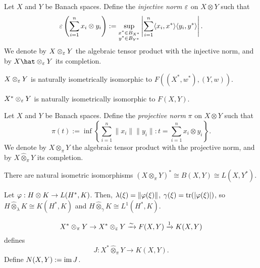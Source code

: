 \documentclass{../../small}
\begin{document}
\begin{prb}

\end{prb}

\begin{prb}
Let $X$ and $Y$ be Banach spaces.
Define the \emph{injective norm} $\varepsilon$ on $X\otimes Y$ such that
\[\varepsilon\left(\sum_{i=1}^nx_i\otimes y_i\right):=\sup_{\substack{x^*\in B_{X^*}\\y^*\in B_{Y^*}}}\left|\sum_{i=1}^n\langle x_i,x^*\rangle\langle y_i,y^*\rangle\right|.\]
We denote by $X\otimes_\varepsilon Y$ the algebraic tensor product with the injective norm, and by $X\hat\otimes_\e Y$ its completion.
\begin{parts}
\item $X\otimes_\varepsilon Y$ is naturally isometrically isomorphic to $F((X^*,w^*),(Y,w))$.
\item $X^*\otimes_\varepsilon Y$ is naturally isometrically isomorphic to $F(X,Y)$.
\end{parts}
\end{prb}

\begin{prb}
Let $X$ and $Y$ be Banach spaces.
Define the \emph{projective norm} $\pi$ on $X\otimes Y$ such that
\[\pi\left(t\right):=\inf\left\{\sum_{i=1}^n\|x_i\|\|y_i\|:t=\sum_{i=1}^nx_i\otimes y_i\right\}.\]
We denote by $X\otimes_\pi Y$ the algebraic tensor product with the projective norm, and by $X\hat\otimes_\pi Y$ its completion.
\begin{parts}
\item There are natural isometric isomorphisms $(X\otimes_\pi Y)^*\cong B(X,Y)\cong L(X,Y^*)$.
\item
\end{parts}
\end{prb}

\begin{prb}

Let $\varphi:H\otimes K\to L(H^*,K)$.
Then, $\lambda(\xi)=\|\varphi(\xi)\|$, $\gamma(\xi)=\operatorname{tr}(|\varphi(\xi)|)$, so $H\hat\otimes_\lambda K\cong K(H^*,K)$ and $H\hat\otimes_\gamma K\cong L^1(H^*,K)$.
\end{prb}


\begin{prb}
\[X^*\otimes_\pi Y\to X^*\otimes_\varepsilon Y\xrightarrow{\sim} F(X,Y)\xrightarrow{1}K(X,Y)\]
defines
\[J:X^*\hat\otimes_\pi Y\to K(X,Y).\]
Define $N(X,Y):=\operatorname{im} J$.
\end{prb}
\end{document}
